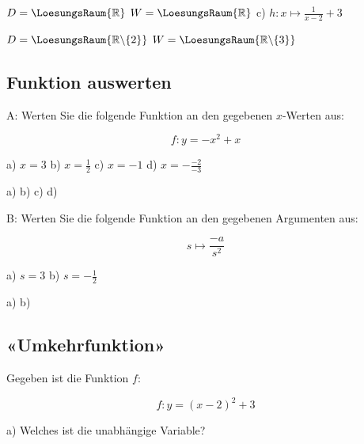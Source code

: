 
$D = \LoesungsRaum{\mathbb{R}}$
\vspace{5mm}
$W = \LoesungsRaum{\mathbb{R}}$
\newpage
c) $h: x\mapsto \frac{1}{x-2}+3$


$D = \LoesungsRaum{\mathbb{R}\backslash{} \{2\}}$
\vspace{5mm}
$W = \LoesungsRaum{\mathbb{R}\backslash{} \{3\}}$
\newpage
\subsection{Funktion auswerten}
A: Werten Sie die folgende Funktion an den gegebenen $x$-Werten aus:

$$f: y = -x^2 + x$$

a) $x = 3$ \hspace{30mm} b) $x = \frac12$ \hspace{28mm} c)
$x=-1$ \hspace{26mm} d) $x=-\frac{-2}{-3}$

\vspace{5mm}

a)  \hspace{9mm} b) \hspace{9mm}
c)  \hspace{9mm}d) 

\vspace{20mm}

B: Werten Sie die folgende Funktion an den gegebenen Argumenten aus:

$$s \mapsto \frac{-a}{s^2}$$

a) $s = 3$ \hspace{30mm} b) $s = -\frac12$

\vspace{5mm}
a)  \hspace{9mm}b) 

\newpage
\subsection{«Umkehrfunktion»}
Gegeben ist die Funktion $f$:

$$f: y=(x-2)^2 + 3$$


a) Welches ist die unabhängige Variable?
\vspace{5mm}

